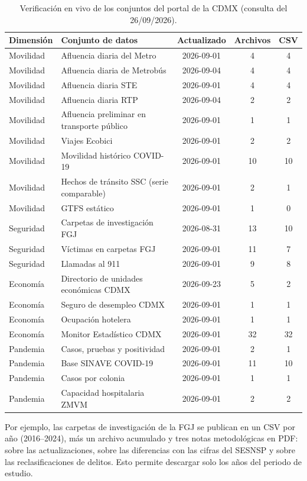 {\small
\begin{longtable}{lL{7.2cm}ccc}
\caption{Verificación en vivo de los conjuntos del portal de la CDMX (consulta del 26/09/2026).}\label{tab:verificacion}\\
\toprule
\textbf{Dimensión} & \textbf{Conjunto de datos} & \textbf{Actualizado} & \textbf{Archivos} & \textbf{CSV}\\
\midrule\endhead
Movilidad & Afluencia diaria del Metro & 2026-09-01 & 4 & 4\\
Movilidad & Afluencia diaria de Metrobús & 2026-09-04 & 4 & 4\\
Movilidad & Afluencia diaria STE & 2026-09-01 & 4 & 4\\
Movilidad & Afluencia diaria RTP & 2026-09-04 & 2 & 2\\
Movilidad & Afluencia preliminar en transporte público & 2026-09-01 & 1 & 1\\
Movilidad & Viajes Ecobici & 2026-09-01 & 2 & 2\\
Movilidad & Movilidad histórico COVID-19 & 2026-09-01 & 10 & 10\\
Movilidad & Hechos de tránsito SSC (serie comparable) & 2026-09-01 & 2 & 1\\
Movilidad & GTFS estático & 2026-09-01 & 1 & 0\\
Seguridad & Carpetas de investigación FGJ & 2026-08-31 & 13 & 10\\
Seguridad & Víctimas en carpetas FGJ & 2026-09-01 & 11 & 7\\
Seguridad & Llamadas al 911 & 2026-09-01 & 9 & 8\\
Economía & Directorio de unidades económicas CDMX & 2026-09-23 & 5 & 2\\
Economía & Seguro de desempleo CDMX & 2026-09-01 & 1 & 1\\
Economía & Ocupación hotelera & 2026-09-01 & 1 & 1\\
Economía & Monitor Estadístico CDMX & 2026-09-01 & 32 & 32\\
Pandemia & Casos, pruebas y positividad & 2026-09-01 & 2 & 1\\
Pandemia & Base SINAVE COVID-19 & 2026-09-01 & 11 & 10\\
Pandemia & Casos por colonia & 2026-09-01 & 1 & 1\\
Pandemia & Capacidad hospitalaria ZMVM & 2026-09-01 & 2 & 2\\
\bottomrule
\end{longtable}}

Por ejemplo, las carpetas de investigación de la FGJ se publican en un CSV por año (2016--2024),
más un archivo acumulado y tres notas metodológicas en PDF: sobre las actualizaciones, sobre las
diferencias con las cifras del SESNSP y sobre las reclasificaciones de delitos. Esto permite
descargar solo los años del periodo de estudio.

